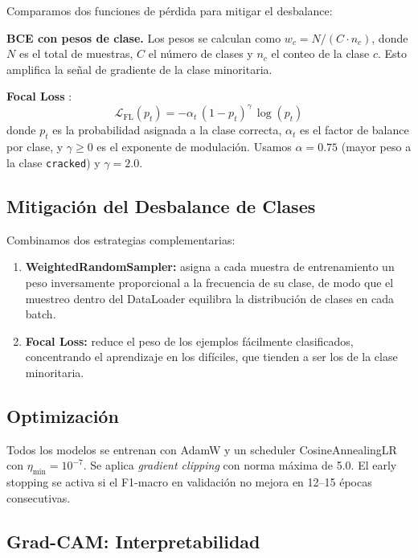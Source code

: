 \documentclass{article}
\begin{document}
Comparamos dos funciones de pérdida para mitigar el desbalance:

\textbf{BCE con pesos de clase.} Los pesos se calculan como $w_c = N / (C \cdot n_c)$, 
donde $N$ es el total de muestras, $C$ el número de clases y $n_c$ el conteo de 
la clase $c$. Esto amplifica la señal de gradiente de la clase minoritaria.

\textbf{Focal Loss} \cite{lin2017focal}: 
\begin{equation}
  \mathcal{L}_{\text{FL}}(p_t) = -\alpha_t \,(1 - p_t)^\gamma \,\log(p_t)
  \label{eq:focal}
\end{equation}
donde $p_t$ es la probabilidad asignada a la clase correcta, $\alpha_t$ es el 
factor de balance por clase, y $\gamma \geq 0$ es el exponente de modulación. 
Usamos $\alpha = 0.75$ (mayor peso a la clase \texttt{cracked}) y $\gamma = 2.0$.

\subsection{Mitigación del Desbalance de Clases}
\label{ssec:imbalance_strategy}

Combinamos dos estrategias complementarias:

\begin{enumerate}
  \item \textbf{WeightedRandomSampler:} asigna a cada muestra de entrenamiento un peso inversamente proporcional a la frecuencia de su clase, de modo que el muestreo dentro del DataLoader equilibra la distribución de clases en cada batch.
  \item \textbf{Focal Loss:} reduce el peso de los ejemplos fácilmente clasificados, concentrando el aprendizaje en los difíciles, que tienden a ser los de la clase minoritaria.
\end{enumerate}

\subsection{Optimización}
\label{ssec:optim}

Todos los modelos se entrenan con AdamW \cite{loshchilov2018decoupled} y un 
scheduler CosineAnnealingLR con $\eta_{\min} = 10^{-7}$. Se aplica \emph{gradient 
clipping} con norma máxima de 5.0. El early stopping se activa si el F1-macro en 
validación no mejora en 12–15 épocas consecutivas.

\subsection{Grad-CAM: Interpretabilidad}
\label{ssec:gradcam}
\end{document}
